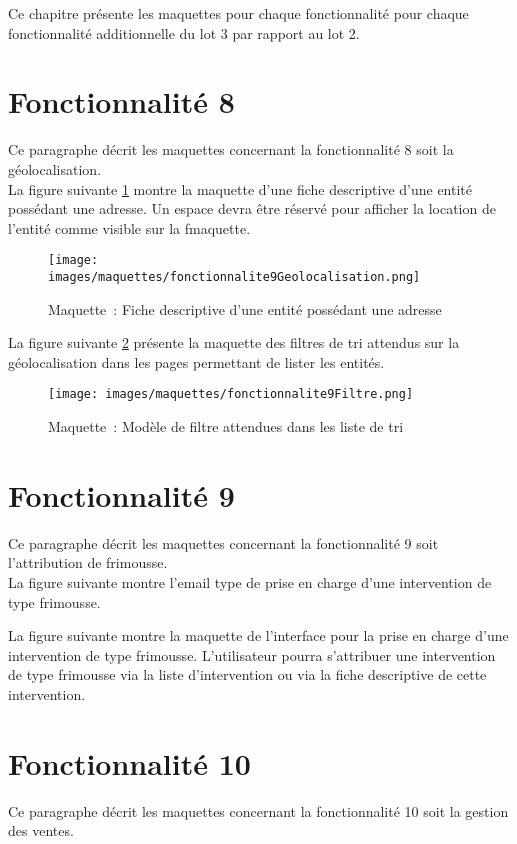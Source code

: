 Ce chapitre présente les maquettes pour chaque fonctionnalité pour chaque fonctionnalité additionnelle du lot 3 par rapport au lot 2.


\section{Fonctionnalité 8}
Ce paragraphe décrit les maquettes concernant la fonctionnalité 8 soit la géolocalisation. \\

La figure suivante \ref{maquette8-1} montre la maquette d'une fiche descriptive d'une entité possédant une adresse. Un espace devra être réservé pour afficher la location de l'entité comme visible sur la fmaquette.
\begin{figure}[H]
	\centering
	\texttt{[image: images/maquettes/fonctionnalite9Geolocalisation.png]}
	\caption{Maquette~: Fiche descriptive d'une entité possédant une adresse}
	\label{maquette8-1}
\end{figure}
La figure suivante \ref{maquette8-2} présente la maquette des filtres de tri attendus sur la géolocalisation dans les pages permettant de lister les entités.
\begin{figure}[H]
	\centering
	\texttt{[image: images/maquettes/fonctionnalite9Filtre.png]}
	\caption{Maquette~: Modèle de filtre attendues dans les liste de tri}
	\label{maquette8-2}
\end{figure}

\section{Fonctionnalité 9}
Ce paragraphe décrit les maquettes concernant la fonctionnalité 9 soit l'attribution de frimousse. \\

La figure suivante montre l'email type de prise en charge d'une intervention de type frimousse.

La figure suivante montre la maquette de l'interface pour la prise en charge d'une intervention de type frimousse. L'utilisateur pourra s'attribuer une intervention de type frimousse via la liste d'intervention ou via la fiche descriptive de cette intervention.


\section{Fonctionnalité 10}
Ce paragraphe décrit les maquettes concernant la fonctionnalité 10 soit la gestion des ventes. \\

